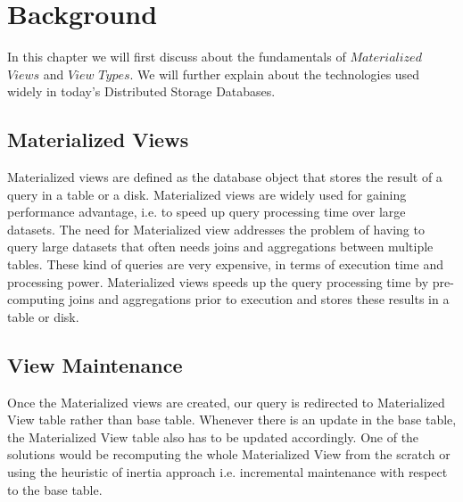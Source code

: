 \documentclass[11pt,a4paper,bibtotoc,idxtotoc,headsepline,footsepline,footexclude,BCOR12mm,DIV13]{scrbook}
\begin{document}


\chapter{Background}
\label{chap:background}

In this chapter we will first discuss about the fundamentals of $Materialized$ $Views$ and $View$ $Types$. We will further explain about the technologies used widely in today's Distributed Storage Databases. 

\section{Materialized Views}

Materialized views are defined as the database object that stores the result of a query in a table or a disk. Materialized views are widely used for gaining performance advantage, i.e. to speed up query processing time over large datasets. The need for Materialized view addresses the problem of having to query large datasets that often needs joins and aggregations between multiple tables. These kind of queries are very expensive, in terms of execution time and processing power. Materialized views speeds up the query processing time by pre-computing joins and aggregations prior to execution and stores these results in a table or disk\cite{materializedview:oracle}. 

\section{View Maintenance}
Once the Materialized views are created, our query is redirected to Materialized View table rather than base table. Whenever there is an update in the base table, the Materialized View table also has to be updated accordingly. One of the solutions would be recomputing the whole Materialized View from the scratch or using the heuristic of inertia\cite{maintenance:materializedviews} approach i.e. incremental maintenance with respect to the base table.
\end{document}
